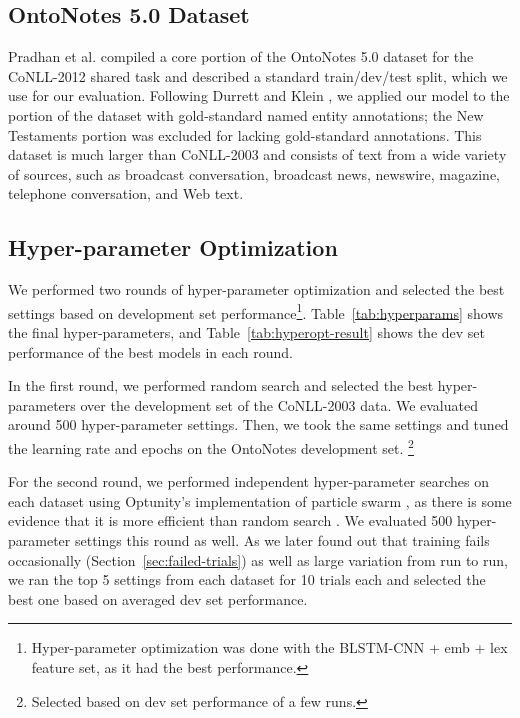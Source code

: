\documentclass[11pt,letterpaper]{article}
\begin{document}
\subsection{OntoNotes 5.0 Dataset}

Pradhan et al.  compiled a core portion of the OntoNotes 5.0 dataset for the CoNLL-2012 shared task and described a standard train/dev/test split, which we use for our evaluation. Following Durrett and Klein , we applied our model to the portion of the dataset with gold-standard named entity annotations; the New Testaments portion was excluded for lacking gold-standard annotations. This dataset is much larger than CoNLL-2003 and consists of text from a wide variety of sources, such as broadcast conversation, broadcast news, newswire, magazine, telephone conversation, and Web text.

\subsection{Hyper-parameter Optimization}
\label{sec:hyperopt}

We performed two rounds of hyper-parameter optimization and selected the best settings based on development set performance\footnote{Hyper-parameter optimization was done with the BLSTM-CNN + emb + lex feature set, as it had the best performance.}. Table~\ref{tab:hyperparams} shows the final hyper-parameters, and Table~\ref{tab:hyperopt-result} shows the dev set performance of the best models in each round.  

In the first round, we performed random search and selected the best hyper-parameters over the development set of the CoNLL-2003 data. We evaluated around 500 hyper-parameter settings. Then, we took the same settings and tuned the learning rate and epochs on the OntoNotes development set.
  \footnote{Selected based on dev set performance of a few runs.}

For the second round, we performed independent hyper-parameter searches on each dataset using Optunity's implementation of particle swarm \cite{claesen2014}, as there is some evidence that it is more efficient than random search \cite{clerc2002}. We evaluated 500 hyper-parameter settings this round as well. As we later found out that training fails occasionally (Section~\ref{sec:failed-trials}) as well as large variation from run to run, we ran the top 5 settings from each dataset for 10 trials each and selected the best one based on averaged dev set performance.
\end{document}

